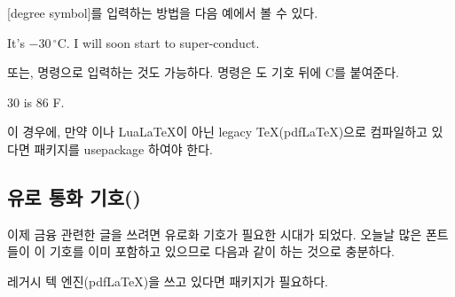 [degree symbol]를 입력하는 방법을 다음 예에서 볼 수 있다.

\begin{example}
It's $-30\,^{\circ}\mathrm{C}$.
I will soon start to
super-conduct.
\end{example}

또는,  명령으로 입력하는 것도 가능하다.  명령은 도 기호 뒤에 C를 붙여준다.

\begin{example}
30 \textcelsius{} is
86 \textdegree{}F.
\end{example}
\noindent 이 경우에, 만약 \XeLaTeX 이나 Lua\LaTeX 이 아닌 legacy \TeX (pdf\LaTeX)으로 컴파일하고 있다면 
패키지를 usepackage 하여야 한다.

\subsection{유로 통화 기호(\texorpdfstring{{\texteuro}}{})}

이제 금융 관련한 글을 쓰려면 유로화 기호가 필요한 시대가 되었다.
오늘날 많은 폰트들이 이 기호를 이미 포함하고 있으므로 다음과 같이 하는 것으로 충분하다.
\begin{example}
  \texteuro
\end{example}
\noindent 레거시 텍 엔진(pdf\LaTeX)을 쓰고 있다면  패키지가 필요하다.

